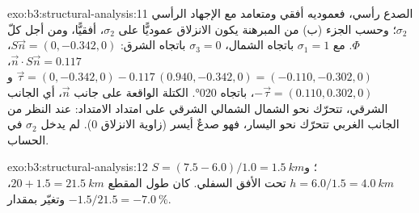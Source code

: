 \begin{solution}{exo:b3:structural-analysis:11}
الصدع رأسي، فعموديه أفقي ومتعامد مع الإجهاد
الرأسي $\sigma_2$؛ وحسب الجزء (ب) من المبرهنة يكون الانزلاق عموديًّا على
$\sigma_2$، أفقيًّا، ومن أجل كلّ $\Phi$. مع $\sigma_1 = 1$ باتجاه الشمال،
$\sigma_3 = 0$ باتجاه الشرق: $S\vec n = (0, -0.342, 0)$، $\vec n\cdot S\vec n =
0.117$، $\vec\tau = (0, -0.342, 0) - 0.117\,(0.940, -0.342, 0) = (-0.110,
-0.302, 0)$ و$-\vec\tau = (0.110, 0.302, 0)$، باتجاه \ang{020}. الكتلة
الواقعة على جانب $\vec n$، أي الجانب الشرقي، تتحرّك نحو الشمال الشمالي الشرقي على امتداد
الامتداد: عند النظر من الجانب الغربي تتحرّك نحو اليسار، فهو صدعٌ أيسر (زاوية الانزلاق
0). لم يدخل $\sigma_2$ في الحساب.
\end{solution}

\begin{solution}{exo:b3:structural-analysis:12}
$S = (7.5 - 6.0)/1.0 = \qty{1.5}{km}$؛ و$h = 6.0/1.5 = \qty{4.0}{km}$ تحت
الأفق السفلي. كان طول المقطع $20 + 1.5 = \qty{21.5}{km}$، وتغيّر
بمقدار $-1.5/21.5 = \qty{-7.0}{\percent}$.
\end{solution}

